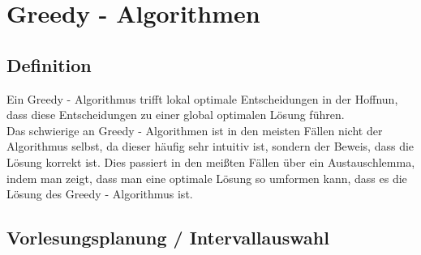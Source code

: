 \section{Greedy - Algorithmen}

\subsection{Definition}

Ein Greedy - Algorithmus trifft lokal optimale Entscheidungen in der Hoffnun, dass diese Entscheidungen zu einer global optimalen Lösung führen.\\

Das schwierige an Greedy - Algorithmen ist in den meisten Fällen nicht der Algorithmus selbst, da dieser häufig sehr intuitiv ist, sondern der Beweis, dass die Lösung korrekt ist. Dies passiert in den meißten Fällen über ein Austauschlemma, indem man zeigt, dass man eine optimale Lösung so umformen kann, dass es die Lösung des Greedy - Algorithmus ist.

\subsection{Vorlesungsplanung / Intervallauswahl}

